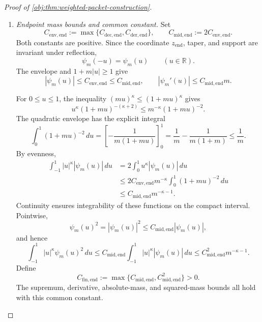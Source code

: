 \begin{proof}[Proof of \cref{obj:thm:weighted-packet-construction}]
\begin{enumerate}
To obtain continuous differentiability on the whole line, define
\[
\mathcal T(u):=
\begin{cases}
(1-u^2)^4,&|u|\le1,\\
0,&|u|>1.
\end{cases}
\]
For every \(u\in\mathbb R\),
\[
\mathcal T(u)
=
\frac{(1-u^2)^4+(1-u^2)|1-u^2|^3}{2}.
\]
The function \(v\mapsto|v|^3\) is continuously differentiable, with derivative \(3v|v|\). Thus \(\mathcal T\) is continuously differentiable, and
\[
\psi_m(u)
=
\mathcal T(u)\frac{K_m(z_{\mathrm{end}}(u))}{K_m(-1)}
\qquad(u\in\mathbb R)
\]
is a product of continuously differentiable functions. Outside \([-1,1]\) the packet is locally zero, so
\[
\psi_m'(u)=0\qquad(|u|>1).
\]
Continuity of \(\psi_m'\) extends the derivative bound from the complement of
\(\{-1,0,1\}\) to all of \(\mathbb R\).

\item \emph{Endpoint mass bounds and common constant.}
Set
\[
C_{\mathrm{env,end}}
:=
\max\{C_{\mathrm{dec,end}},C_{\mathrm{der,end}}\},
\qquad
C_{\mathrm{mid,end}}:=2C_{\mathrm{env,end}}.
\]
Both constants are positive. Since the coordinate \(z_{\mathrm{end}}\), taper, and support are invariant under reflection,
\[
\psi_m(-u)=\psi_m(u)\qquad(u\in\mathbb R).
\]
The envelope and \(1+m|u|\ge1\) give
\[
|\psi_m(u)|\le C_{\mathrm{env,end}}\le C_{\mathrm{mid,end}},
\qquad
|\psi_m'(u)|\le C_{\mathrm{mid,end}}m.
\]

For \(0\le u\le1\), the inequality
\((mu)^\kappa\le(1+mu)^\kappa\) gives
\[
u^\kappa(1+mu)^{-(\kappa+2)}
\le m^{-\kappa}(1+mu)^{-2}.
\]
The quadratic envelope has the explicit integral
\[
\int_0^1(1+mu)^{-2}\,du
=
\left[-\frac1{m(1+mu)}\right]_0^1
=
\frac1m-\frac1{m(1+m)}
\le\frac1m.
\]
By evenness,
\[
\begin{split}
\int_{-1}^1|u|^\kappa|\psi_m(u)|\,du
&=
2\int_0^1u^\kappa|\psi_m(u)|\,du\\
&\le
2C_{\mathrm{env,end}}m^{-\kappa}
\int_0^1(1+mu)^{-2}\,du\\
&\le C_{\mathrm{mid,end}}m^{-\kappa-1}.
\end{split}
\]
Continuity ensures integrability of these functions on the compact interval. Pointwise,
\[
\psi_m(u)^2
=
|\psi_m(u)|^2
\le C_{\mathrm{mid,end}}|\psi_m(u)|,
\]
and hence
\[
\int_{-1}^1|u|^\kappa\psi_m(u)^2\,du
\le
C_{\mathrm{mid,end}}
\int_{-1}^1|u|^\kappa|\psi_m(u)|\,du
\le C_{\mathrm{mid,end}}^2m^{-\kappa-1}.
\]
Define
\[
C_{\mathrm{fin,end}}
:=
\max\{C_{\mathrm{mid,end}},C_{\mathrm{mid,end}}^2\}>0.
\]
The supremum, derivative, absolute-mass, and squared-mass bounds all hold with this common constant.


\end{enumerate}
\end{proof}
